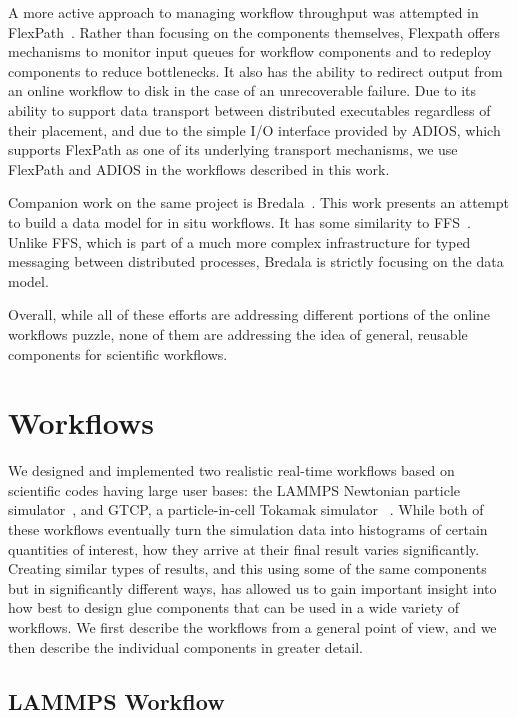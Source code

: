 \documentclass[conference]{IEEEtran}
\begin{document}
A more active approach to managing workflow throughput was attempted in
FlexPath~\cite{Dayal:2014:flexpath}. Rather than focusing on the components
themselves, Flexpath offers mechanisms to monitor input queues for workflow
components and to redeploy components to reduce bottlenecks. It also has the
ability to redirect output from an online workflow to disk in the case of an
unrecoverable failure. Due to its ability to support data transport between
distributed executables regardless of their placement, and due to the simple I/O
interface provided by ADIOS, which supports FlexPath as one of its underlying
transport mechanisms, we use FlexPath and ADIOS in the workflows described
in this work.

Companion work on the same project is Bredala~\cite{dreher:2016:bredala}. This
work presents an attempt to build a data model for in situ workflows. It has
some similarity to FFS~\cite{eisenhauer:2011:ffs}. Unlike FFS, which is part
of a much more complex infrastructure for typed messaging between distributed
processes, Bredala is strictly focusing on the data model.

Overall, while all of these efforts are addressing different portions of the
online workflows puzzle, none of them are addressing the idea of general,
reusable components for scientific workflows.

\section{Workflows}
\label{s:workflow}

We designed and implemented two realistic real-time workflows based on
scientific codes having large user bases: the LAMMPS Newtonian particle
simulator~\cite{plimpton:1997:lammps}, and GTCP, a particle-in-cell
Tokamak simulator ~\cite{lin:gtc}. While both of these
workflows eventually turn the simulation data into histograms of certain
quantities of interest, how they arrive at their final result varies
significantly. Creating similar types of results, and this using some of the
same components but in significantly different ways, has allowed us to gain
important insight into how best to design glue components that can be used in a wide
variety of workflows. We first describe the workflows from a general point of
view, and we then describe the individual components in greater detail.

\subsection{LAMMPS Workflow}
\end{document}
